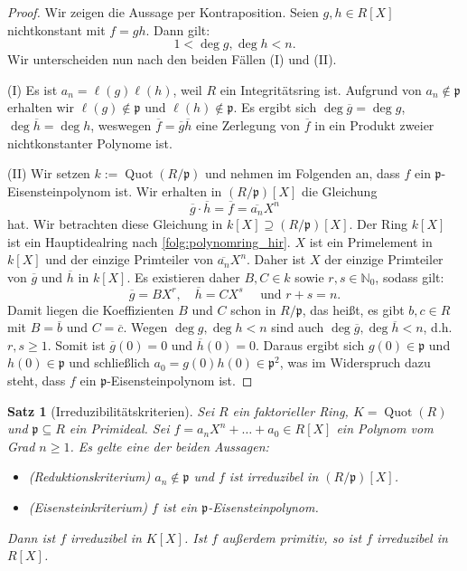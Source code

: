 \documentclass[a4paper, twoside, 11pt, ngerman]{report}
\newcommand{\NN}{\mathds N}
\DeclareMathOperator{\Quot}{Quot}
\theoremstyle{definistyle}
\newtheorem{satz}{Satz}[section]
\theoremstyle{remark}
\begin{document}
\begin{proof}
Wir zeigen die Aussage per Kontraposition.
Seien $g, h \in R[X]$ nichtkonstant mit $f = gh$. Dann gilt:
\[
1 < \deg g, \deg h < n.
\]
Wir unterscheiden nun nach den beiden Fällen (I) und (II).

(I) Es ist $a_n = \ell(g) \ell(h)$, weil $R$ ein Integritätsring ist. Aufgrund von $a_n \notin \mathfrak{p}$ erhalten wir $\ell(g) \notin \mathfrak{p}$ und $\ell(h) \notin \mathfrak{p}$.
Es ergibt sich $\deg\overline{g}=\deg g$, $\deg\overline{h}=\deg h$, weswegen
$\overline{f}=\overline{g}\overline{h}$ eine Zerlegung von $\overline{f}$ in ein Produkt
zweier nichtkonstanter Polynome ist.

(II) Wir setzen $k := \Quot(R / \mathfrak{p})$ und nehmen im Folgenden an, dass $f$ ein $\mathfrak{p}$-Eisensteinpolynom ist. Wir erhalten in $(R / \mathfrak{p})[X]$ die Gleichung
\[
 \overline{g} \cdot \overline{h} = \overline{f} = \overline{a_n} X^n
\]
hat. Wir betrachten diese Gleichung in $k[X] \supseteq (R / \mathfrak{p})[X]$. Der Ring $k[X]$ ist ein Hauptidealring nach \ref{folg:polynomring_hir}. $X$ ist ein Primelement in $k[X]$ und der einzige Primteiler von $\overline{a_n}X^n$. Daher ist $X$ der einzige Primteiler von $\overline{g}$ und $\overline{h}$ in $k[X]$. Es existieren daher $B, C \in k$ sowie $r, s \in \NN_0$, sodass gilt:
\[
\overline{g} = B X^r, \quad \overline{h} = C X^s \quad \text{ und } r + s = n.
\]
Damit liegen die Koeffizienten $B$ und $C$ schon in $R / \mathfrak{p}$, das heißt, es gibt $b, c \in R$ mit $B = \overline{b}$ und $C = \overline{c}$. Wegen $\deg g,\deg h<n$ sind auch $\deg \overline{g},\deg \overline{h}<n$, d.h. $r, s \geq 1$. Somit ist $\overline{g}(0) = 0$ und $\overline{h}(0) = 0$. Daraus ergibt sich $g(0) \in \mathfrak{p}$ und $h(0) \in \mathfrak{p}$ und schließlich $a_0 = g(0) h(0) \in \mathfrak{p}^2$, was im Widerspruch dazu steht, dass $f$ ein $\mathfrak{p}$-Eisensteinpolynom ist. 
\end{proof}

\begin{satz}[Irreduzibilitätskriterien]\label{satz:irreduzibilitaetskriterien}
Sei $R$ ein faktorieller Ring, $K = \Quot(R)$ und $\mathfrak{p} \subseteq R$ ein Primideal. Sei $f = a_n X^n + \dots + a_0 \in R[X]$ ein Polynom vom Grad $n\geq 1$. Es gelte eine der beiden Aussagen:
\begin{itemize}
    \item[(I)] (\textit{Reduktionskriterium}) $a_n \notin \mathfrak{p}$ und $f$ ist irreduzibel in $(R / \mathfrak{p})[X]$.
    \item[(II)] (\textit{Eisensteinkriterium}) $f$ ist ein $\mathfrak{p}$-Eisensteinpolynom.
\end{itemize}
Dann ist $f$ irreduzibel in $K[X]$. Ist $f$ außerdem primitiv, so ist $f$ irreduzibel in $R[X]$.
\end{satz}
\end{document}
